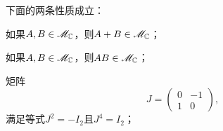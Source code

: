   \begin{mybox}
    \begin{theorem}[两个特殊域之间的一个同构.]

      下面的两条性质成立：
      \begin{enum}
        \item 如果$A,B\in\mathscr M_{\mathbb C}$，则$A+B\in\mathscr M_{\mathbb C}$；
        \item 如果$A,B\in\mathscr M_{\mathbb C}$，则$AB\in\mathscr M_{\mathbb C}$；
        \item 矩阵
        \[
          J = \begin{pmatrix}
            0 & -1 \\
            1 & 0
          \end{pmatrix},
        \]
        满足等式$J^2=-I_2$且$J^4=I_2$；
      \end{enum}


\end{theorem}
\end{mybox}
